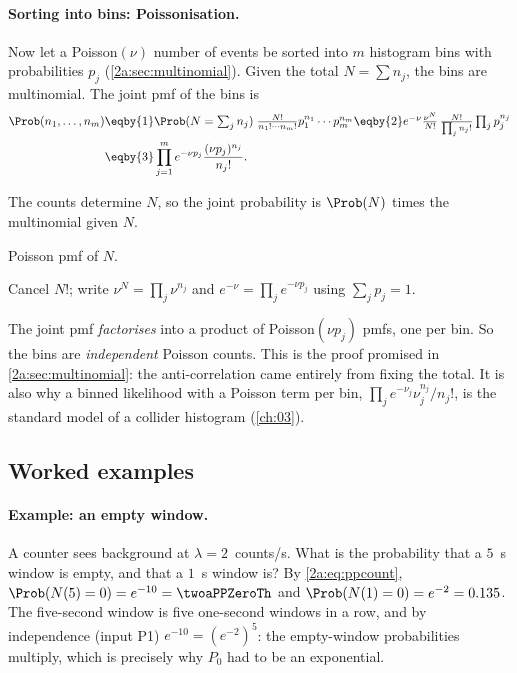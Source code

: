 \paragraph{Sorting into bins: Poissonisation.} Now let a Poisson$(\nu)$ number of events be sorted into $m$ histogram bins with probabilities $p_j$ (\cref{2a:sec:multinomial}). Given the total $N=\sum n_j$, the bins are multinomial. The joint pmf of the bins is
\begin{align*}
  \Prob(n_1,\dots,n_m)
  &\eqby{1} \Prob(N=\textstyle\sum_jn_j)\;\frac{N!}{n_1!\cdots n_m!}p_1^{n_1}\cdots p_m^{n_m}
  \eqby{2} e^{-\nu}\frac{\nu^N}{N!}\,\frac{N!}{\prod_jn_j!}\prod_jp_j^{n_j}\\
  &\eqby{3} \prod_{j=1}^m e^{-\nu p_j}\frac{(\nu p_j)^{n_j}}{n_j!} .
\end{align*}
\begin{explain}
  \item The counts determine $N$, so the joint probability is $\Prob(N)$ times the multinomial given $N$.
  \item Poisson pmf of $N$.
  \item Cancel $N!$; write $\nu^N=\prod_j\nu^{n_j}$ and $e^{-\nu}=\prod_je^{-\nu p_j}$ using $\sum_jp_j=1$.
\end{explain}
The joint pmf \emph{factorises} into a product of Poisson$(\nu p_j)$ pmfs, one per bin. So the bins are \emph{independent} Poisson counts. This is the proof promised in \cref{2a:sec:multinomial}: the anti-correlation came entirely from fixing the total. It is also why a binned likelihood with a Poisson term per bin, $\prod_je^{-\nu_j}\nu_j^{n_j}/n_j!$, is the standard model of a collider histogram (\cref{ch:03}).

\subsection{Worked examples}

\paragraph{Example: an empty window.}
A counter sees background at $\lambda=2$~counts/s. What is the probability that a $5$~s window is empty, and that a $1$~s window is? By \eqref{2a:eq:ppcount}, $\Prob(N(5)=0)=e^{-10}=\twoaPPZeroTh$ and $\Prob(N(1)=0)=e^{-2}=0.135$. The five-second window is five one-second windows in a row, and by independence (input P1) $e^{-10}=(e^{-2})^5$: the empty-window probabilities multiply, which is precisely why $P_0$ had to be an exponential.

